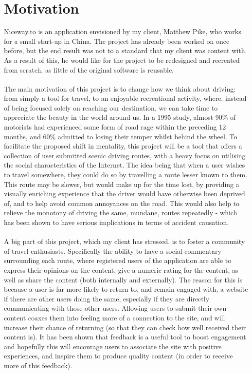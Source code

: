 \section{Motivation}
Niceway.to is an application envisioned by my client, Matthew Pike, who works for a small start-up in China. The project has already been worked on once before, but the end result was not to a standard that my client was content with. As a result of this, he would like for the project to be redesigned and recreated from scratch, as little of the original software is reusable.\ \\
\ \\
The main motivation of this project is to change how we think about driving: from simply a tool for travel, to an enjoyable recreational activity, where, instead of being focused solely on reaching our destination, we can take time to appreciate the beauty in the world around us. In a 1995 study, almost 90\% of motorists had experienced some form of road rage within the preceding 12 months, and 60\% admitted to losing their temper whilst behind the wheel\cite{joint1995road}. To facilitate the proposed shift in mentality, this project will be a tool that offers a collection of user submitted scenic driving routes, with a heavy focus on utilising the social characteristics of the Internet. The idea being that when a user wishes to travel somewhere, they could do so by travelling a route lesser known to them. This route may be slower, but would make up for the time lost, by providing a visually enriching experience that the driver would have otherwise been deprived of, and to help avoid common annoyances on the road. This would also help to relieve the monotony of driving the same, mundane, routes repeatedly - which has been shown to have serious implications in terms of accident causation\cite{thiffault2003monotony}. \ \\
\ \\
A big part of this project, which my client has stressed, is to foster a community of travel enthusiasts. Specifically the ability to have a social commentary surrounding each route, where registered users of the application are able to express their opinions on the content, give a numeric rating for the content, as well as share the content (both internally and externally). The reason for this is because a user is far more likely to return to, and remain engaged with, a website if there are other users doing the same, especially if they are directly communicating with those other users\cite{ling2005using}. Allowing users to submit their own content coaxes them into feeling more of a connection to the site, and will increase their chance of returning (so that they can check how well received their content is). It has been shown that feedback is a useful tool to boost engagement\cite{o2008user} and hopefully this will encourage users to associate the site with positive experiences, and inspire them to produce quality content (in order to receive more of this feedback).\ \\
